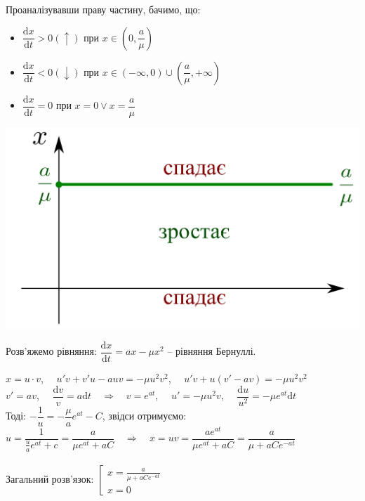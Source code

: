 \documentclass[14pt,a4paper]{scrartcl}
\theoremstyle{definition}
\theoremstyle{definition}
\theoremstyle{definition}
\begin{document}
Проаналізувавши праву частину, бачимо, що:
\begin{itemize}
  \item $\dfrac{\mathrm{d}x}{\mathrm{d}t} > 0 (\uparrow) \text{ при } x \in (0, \dfrac{a}{\mu})$
  \item $\dfrac{\mathrm{d}x}{\mathrm{d}t} < 0 (\downarrow) \text{ при } x \in (- \infty, 0) \cup ( \dfrac{a}{\mu}, +\infty)$
  \item $\dfrac{\mathrm{d}x}{\mathrm{d}t} = 0 \text{ при } x = 0 \lor x = \dfrac{a}{\mu}$
\end{itemize}

\begin{center} \includegraphics[scale=0.28]{assets/lectures_recent-e4b7cd02.png} \end{center}

Розв'яжемо рівняння: $\dfrac{\mathrm{d}x}{\mathrm{d}t} = ax - \mu x^2 $ -- рівняння Бернуллі.
\begin{spacing}{2}
  $x = u\cdot v $, $ \quad u'v + v'u - auv = - \mu u^2 v^2 $, $\quad u'v + u(v' - av) = - \mu u^2 v^2 $\\
  $v' = av$, $\quad \dfrac{\mathrm{d}v}{v} = a\mathrm{d}t \quad \Longrightarrow \quad v = e^{at}$, $\quad u' =- \mu u^2 v$, $\quad \dfrac{\mathrm{d}u}{u^2} = - \mu e^{at}\mathrm{d}t $\\
  Тоді: $ -\dfrac{1}{u} = -\dfrac{ \mu}{a}e^{at} - C $, звідси отримуємо:\\
  $ u = \dfrac{1}{ \frac{u}{a} e^{at} +c } = \dfrac{a}{ \mu e^{at} + aC} \quad \Longrightarrow \quad x = uv = \dfrac{a e^{at}}{ \mu e^{at} + aC  }  =  \dfrac{a}{ \mu  + aCe^{-at}}  $\\ \\
  Загальний розв'язок:
  $\left[ \begin{gathered}
   x= \frac{a}{ \mu  + aCe^{-at}}\\
   x = 0
  \end{gathered} \right.$
\end{spacing}
\end{document}
